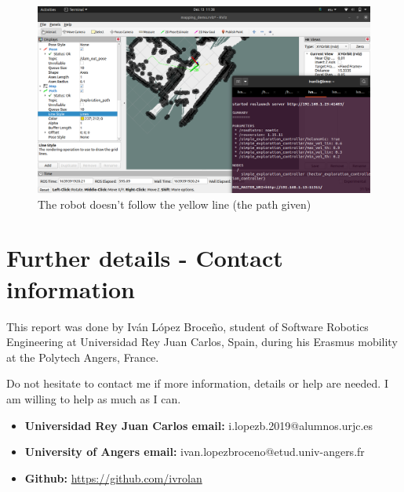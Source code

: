 \documentclass{article}
\begin{document}
\begin{figure}[H]
    \centering
    \includegraphics[width=\linewidth]{simple_controller.png}
    \caption{The robot doesn't follow the yellow line (the path given)}
    \label{fig:simple_exploration_controller}
\end{figure}


\section{Further details - Contact information}

This report was done by Iván López Broceño, student of Software Robotics Engineering at Universidad Rey Juan Carlos, Spain, during his Erasmus mobility at the Polytech Angers, France.  

Do not hesitate to contact me if more information, details or help are needed. I am willing to help as much as I can.
\begin{itemize}
    \item \textbf{Universidad Rey Juan Carlos email:} i.lopezb.2019@alumnos.urjc.es
    \item \textbf{University of Angers email:} ivan.lopezbroceno@etud.univ-angers.fr
    \item \textbf{Github:} \href{https://github.com/ivrolan}{https://github.com/ivrolan}
\end{itemize}
\end{document}
